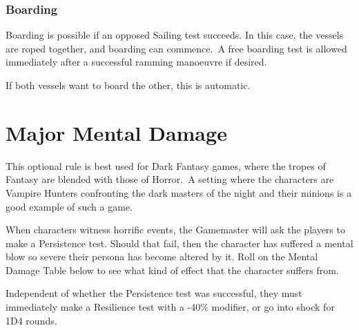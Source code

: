 \subsubsection{Boarding}
Boarding is possible if an opposed Sailing test succeeds. In this case, the vessels are roped together, and boarding can commence. A free boarding test is allowed immediately after a successful ramming manoeuvre if desired.

If both vessels want to board the other, this is automatic.


\section{Major Mental Damage}
This optional rule is best used for Dark Fantasy games, where the tropes of Fantasy are blended with those of Horror. A setting where the characters are Vampire Hunters confronting the dark masters of the night and their minions is a good example of such a game. 

When characters witness horrific events, the Gamemaster will ask the players to make a Persistence test. Should that fail, then the character has suffered a mental blow so severe their persona has become altered by it. Roll on the Mental Damage Table below to see what kind of effect that the character suffers from. 

Independent of whether the Persistence test was successful, they must immediately make a Resilience test with a -40\% modifier, or go into shock for 1D4 rounds. 

